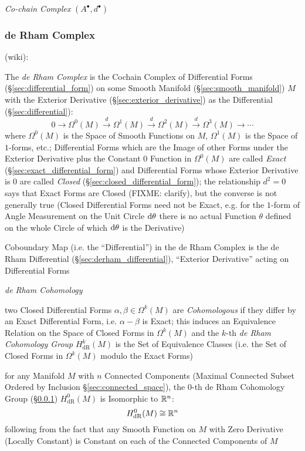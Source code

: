 \emph{Co-chain Complex} $(A^\bullet, d^\bullet)$



\subsubsection{de Rham Complex}\label{sec:derham_complex}

(wiki):

The \emph{de Rham Complex} is the Cochain Complex of Differential Forms
(\S\ref{sec:differential_form}) on some Smooth Manifold
(\S\ref{sec:smooth_manifold}) $M$ with the Exterior Derivative
(\S\ref{sec:exterior_derivative}) as the Differential
(\S\ref{sec:differential}):
\[
  0 \rightarrow \Omega^0(M) \xrightarrow{d} \Omega^1(M) \xrightarrow{d}
  \Omega^2(M) \xrightarrow{d} \Omega^3(M) \rightarrow \cdots
\]
where $\Omega^0(M)$ is the Space of Smooth Functions on $M$, $\Omega^1(M)$ is
the Space of $1$-forms, etc.; Differential Forms which are the Image of other
Forms under the Exterior Derivative plus the Constant $0$ Function in
$\Omega^0(M)$ are called \emph{Exact} (\S\ref{sec:exact_differential_form}) and
Differential Forms whose Exterior Derivative is $0$ are called \emph{Closed}
(\S\ref{sec:closed_differential_form}); the relationship $d^2 = 0$ says that
Exact Forms are Closed (FIXME: clarify), but the converse is not generally true
(Closed Differential Forms need not be Exact, e.g. for the $1$-form of Angle
Measurement on the Unit Circle $\mathrm{d}\theta$ there is no actual Function
$\theta$ defined on the whole Circle of which $\mathrm{d}\theta$ is the
Derivative)

Coboundary Map (i.e. the ``Differential'') in the de Rham Complex is the de Rham
Differential (\S\ref{sec:derham_differential}), ``Exterior Derivative'' acting
on Differential Forms

\emph{de Rham Cohomology}

two Closed Differential Forms $\alpha, \beta \in \Omega^k(M)$ are
\emph{Cohomologous} if they differ by an Exact Differential Form, i.e. $\alpha -
\beta$ is Exact; this induces an Equivalence Relation on the Space of Closed
Forms in $\Omega^k(M)$ and the $k$-th \emph{de Rham Cohomology Group}
$H_{\mathrm{dR}}^k(M)$ is the Set of Equivalence Classes (i.e. the Set of Closed
Forms in $\Omega^k(M)$ modulo the Exact Forms)

for any Manifold $M$ with $n$ Connected Components (Maximal Connected Subset
Ordered by Inclusion \S\ref{sec:connected_space}), the $0$-th de Rham Cohomology
Group (\S\ref{sec:derham_complex}) $H_{\mathrm{dR}}^0(M)$ is Isomorphic to
$\mathbb{R}^n$:
\[
  H_{\mathrm{dR}}^0(M) \cong \mathbb{R}^n
\]
following from the fact that any Smooth Function on $M$ with Zero Derivative
(Locally Constant) is Constant on each of the Connected Components of $M$

